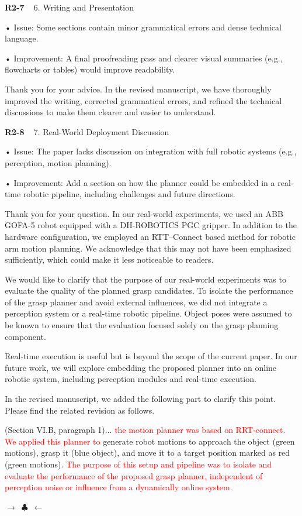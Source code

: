 \documentclass[journal]{IEEEtran}
\newcommand{\rev}[1]{\textcolor{red}{#1}}
\newcommand{\ornamentbreak}{%
\begin{center}
    $\longrightarrow$~$\clubsuit$~$\longleftarrow$
  \end{center}
}
\begin{document}
\bigskip

\noindent
{\textbf{\color{black}R2-7 }\color{gray}~
6. Writing and Presentation

• Issue: Some sections contain minor grammatical errors and dense technical language.

• Improvement: A final proofreading pass and clearer visual summaries (e.g., flowcharts or tables) would improve readability.
}

Thank you for your advice. In the revised manuscript, we have thoroughly improved the writing, corrected grammatical errors, and refined the technical discussions to make them clearer and easier to understand.

\bigskip

\noindent
{\textbf{\color{black}R2-8 }\color{gray}~
7. Real-World Deployment Discussion

• Issue: The paper lacks discussion on integration with full robotic systems (e.g., perception, motion planning).

• Improvement: Add a section on how the planner could be embedded in a real-time robotic pipeline, including challenges and future directions.}

Thank you for your question.
In our real-world experiments, we used an ABB GOFA-5 robot equipped with a DH-ROBOTICS PGC gripper. In addition to the hardware configuration, we employed an RTT–Connect based method for robotic arm motion planning. We acknowledge that this may not have been emphasized sufficiently, which could make it less noticeable to readers. 

We would like to clarify that the purpose of our real-world experiments was to evaluate the quality of the planned grasp candidates. To isolate the performance of the grasp planner and avoid external influences, we did not integrate a perception system or a real-time robotic pipeline. Object poses were assumed to be known to ensure that the evaluation focused solely on the grasp planning component.

Real-time execution is useful but is beyond the scope of the current paper. In our future work, we will explore embedding the proposed planner into an online robotic system, including perception modules and real-time execution.

In the revised manuscript, we added the following part to clarify this point. Please find the related revision as follows.

(Section VI.B, paragraph 1)...
\rev{the motion planner was based on RRT-connect. We applied this planner to} generate robot motions to approach the object (green motions), grasp it (blue object), and move it to a target position marked as red (green motions). \rev{The purpose of this setup and pipeline was to isolate and evaluate the performance of the proposed grasp planner, independent of perception noise or influence from a dynamically online system.}
\bigskip
\ornamentbreak
\end{document}

